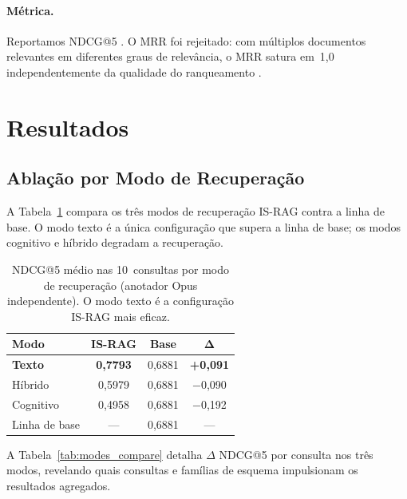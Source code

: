 \documentclass[11pt,a4paper]{article}
\begin{document}
\paragraph{Métrica.}
Reportamos NDCG@5 \citep{jarvelin2002}.
O MRR foi rejeitado: com múltiplos documentos relevantes em diferentes
graus de relevância, o MRR satura em~1,0 independentemente da qualidade
do ranqueamento \citep{buckley2004}.

\section{Resultados}
\label{sec:results}

\subsection{Ablação por Modo de Recuperação}
\label{sec:ablation}

A Tabela~\ref{tab:modes} compara os três modos de recuperação IS-RAG
contra a linha de base.
O modo texto é a única configuração que supera a linha de base;
os modos cognitivo e híbrido degradam a recuperação.

\begin{table}[H]
\centering
\small
\setlength{\tabcolsep}{6pt}
\begin{tabular}{lccc}
\toprule
\textbf{Modo} & \textbf{IS-RAG} & \textbf{Base} & $\boldsymbol{\Delta}$ \\
\midrule
\textbf{Texto}   & \textbf{0,7793} & 0,6881 & \textbf{+0,091} \\
Híbrido          & 0,5979          & 0,6881 & $-$0,090 \\
Cognitivo        & 0,4958          & 0,6881 & $-$0,192 \\
\midrule
Linha de base    & —               & 0,6881 & — \\
\bottomrule
\end{tabular}
\caption{NDCG@5 médio nas 10~consultas por modo de recuperação
  (anotador Opus independente).
  O modo texto é a configuração IS-RAG mais eficaz.}
\label{tab:modes}
\end{table}

A Tabela~\ref{tab:modes_compare} detalha $\Delta$ NDCG@5 por consulta
nos três modos, revelando quais consultas e famílias de esquema
impulsionam os resultados agregados.
\end{document}
